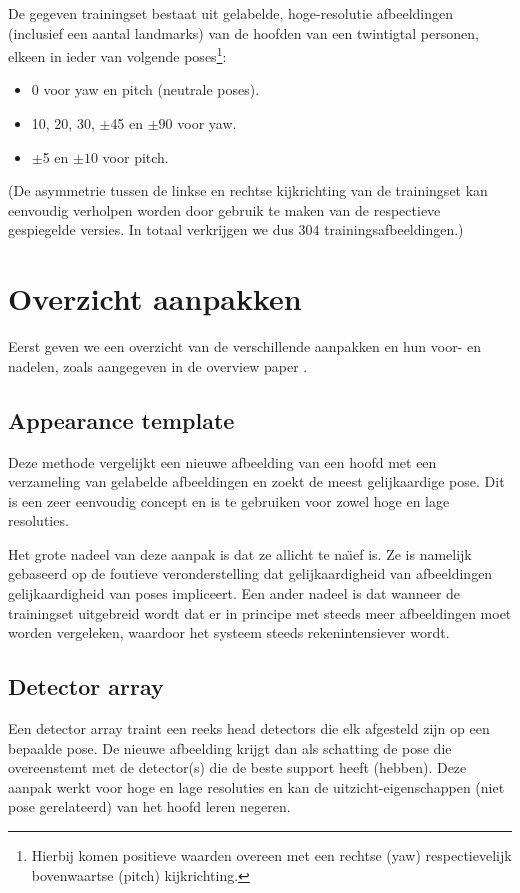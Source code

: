 \documentclass[a4paper,dutch,11pt]{scrartcl}
\begin{document}
De gegeven trainingset bestaat uit gelabelde, hoge-resolutie afbeeldingen (inclusief een aantal landmarks) van de hoofden van een twintigtal personen, elkeen in ieder van volgende poses\footnote{Hierbij komen positieve waarden overeen met een rechtse (yaw) respectievelijk bovenwaartse (pitch) kijkrichting.}:
\begin{itemize}
 \item 0\textdegree{} voor yaw en pitch (neutrale poses).
 \item 10\textdegree{}, 20\textdegree{}, 30\textdegree{}, $\pm$45\textdegree{} en $\pm90$\textdegree{} voor yaw.
 \item $\pm$5\textdegree{} en $\pm10$\textdegree{} voor pitch.
\end{itemize}
(De asymmetrie tussen de linkse en rechtse kijkrichting van de trainingset kan eenvoudig verholpen worden door gebruik te maken van de respectieve gespiegelde versies. In totaal verkrijgen we dus $304$ trainingsafbeeldingen.) 


\section{Overzicht aanpakken}
Eerst geven we een overzicht van de verschillende aanpakken en hun voor- en nadelen, zoals aangegeven in de overview paper \cite{overview}.

\subsection{Appearance template}
Deze methode vergelijkt een nieuwe afbeelding van een hoofd met een verzameling van gelabelde afbeeldingen en zoekt de meest gelijkaardige pose. Dit is een zeer eenvoudig concept en is te gebruiken voor zowel hoge en lage resoluties. 

Het grote nadeel van deze aanpak is dat ze allicht te na\"{\i}ef is. Ze is namelijk gebaseerd op de foutieve veronderstelling dat gelijkaardigheid van afbeeldingen gelijkaardigheid van poses impliceert. Een ander nadeel is dat wanneer de trainingset uitgebreid wordt dat er in principe met steeds meer afbeeldingen moet worden vergeleken, waardoor het systeem steeds rekenintensiever wordt.

\subsection{Detector array} 
Een detector array traint een reeks head detectors die elk afgesteld zijn op een bepaalde pose.
De nieuwe afbeelding krijgt dan als schatting de pose die overeenstemt met de detector(s) die de beste support heeft (hebben). Deze aanpak werkt voor hoge en lage resoluties en kan de uitzicht-eigenschappen (niet pose gerelateerd) van het hoofd leren negeren.
\end{document}
